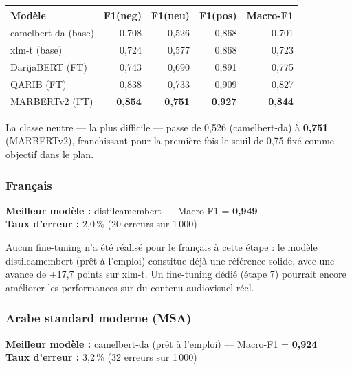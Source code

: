 \documentclass[12pt, a4paper]{article}
\begin{document}
\begin{center}
\begin{tabular}{lrrrr}
\toprule
\textbf{Modèle} & \textbf{F1(neg)} & \textbf{F1(neu)} & \textbf{F1(pos)} & \textbf{Macro-F1} \\
\midrule
camelbert-da (base) & 0{,}708 & 0{,}526 & 0{,}868 & 0{,}701 \\
xlm-t (base)        & 0{,}724 & 0{,}577 & 0{,}868 & 0{,}723 \\
DarijaBERT (FT)     & 0{,}743 & 0{,}690 & 0{,}891 & 0{,}775 \\
QARIB (FT)          & 0{,}838 & 0{,}733 & 0{,}909 & 0{,}827 \\
MARBERTv2 (FT)      & \textbf{0{,}854} & \textbf{0{,}751} & \textbf{0{,}927} & \textbf{0{,}844} \\
\bottomrule
\end{tabular}
\end{center}

La classe neutre — la plus difficile — passe de 0{,}526 (camelbert-da) à
\textbf{0{,}751} (MARBERTv2), franchissant pour la première fois le seuil
de 0{,}75 fixé comme objectif dans le plan.

\subsubsection{Français}

\begin{resultbox}
\textbf{Meilleur modèle :} distilcamembert — Macro-F1 = \textbf{0{,}949}\\
\textbf{Taux d'erreur :} 2{,}0\,\% (20 erreurs sur 1\,000)
\end{resultbox}

Aucun fine-tuning n'a été réalisé pour le français à cette étape : le modèle
distilcamembert (prêt à l'emploi) constitue déjà une référence solide, avec
une avance de +17{,}7 points sur xlm-t. Un fine-tuning dédié (étape 7) pourrait
encore améliorer les performances sur du contenu audiovisuel réel.

\subsubsection{Arabe standard moderne (MSA)}

\begin{resultbox}
\textbf{Meilleur modèle :} camelbert-da (prêt à l'emploi) — Macro-F1 = \textbf{0{,}924}\\
\textbf{Taux d'erreur :} 3{,}2\,\% (32 erreurs sur 1\,000)
\end{resultbox}
\end{document}
